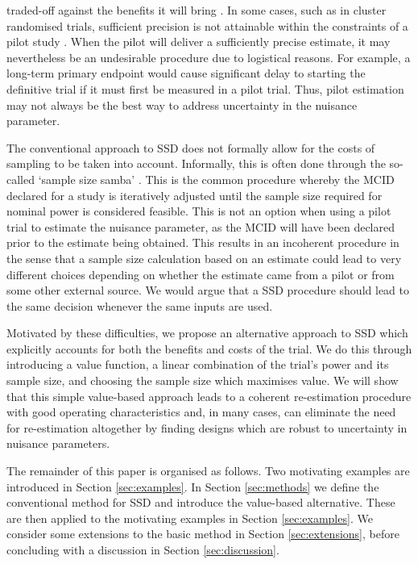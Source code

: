 \documentclass[sagev, Crown]{sagej}
\begin{document}
traded-off against the benefits it will bring \cite{Teare2014, Whitehead2015}. In some cases, such as in cluster randomised trials, sufficient precision is not attainable within the constraints of a pilot study \cite{Lake2002, Eldridge2015}. When the pilot will deliver a sufficiently  precise estimate, it may nevertheless be an undesirable procedure due to logistical reasons. For example, a long-term primary endpoint would cause significant delay to starting the definitive trial if it must first be measured in a pilot trial. Thus, pilot estimation may not always be the best way to address uncertainty in the nuisance parameter.

The conventional approach to SSD does not formally allow for the costs of sampling to be taken into account. Informally, this is often done through the so-called `sample size samba' \cite{Schulz2005}. This is the common procedure whereby the MCID declared for a study is iteratively adjusted until the sample size required for nominal power is considered feasible. This is not an option when using a pilot trial to estimate the nuisance parameter, as the MCID will have been declared prior to the estimate being obtained. This results in an incoherent procedure in the sense that a sample size calculation based on an estimate could lead to very different choices depending on whether the estimate came from a pilot or from some other external source. We would argue that a SSD procedure should lead to the same decision whenever the same inputs are used.

Motivated by these difficulties, we propose an alternative approach to SSD which explicitly accounts for both the benefits and costs of the trial. We do this through introducing a value function, a linear combination of the trial's power and its sample size, and choosing the sample size which maximises value. We will show that this simple value-based approach  leads to a coherent re-estimation procedure with good operating characteristics and, in many cases, can eliminate the need for re-estimation altogether by finding designs which are robust to uncertainty in nuisance parameters.

The remainder of this paper is organised as follows. Two motivating examples are introduced in Section \ref{sec:examples}. In Section \ref{sec:methods} we define the conventional method for SSD and introduce the value-based alternative. These are then applied to the motivating examples in Section \ref{sec:examples}. We consider some extensions to the basic method in Section \ref{sec:extensions}, before concluding with a discussion in Section \ref{sec:discussion}.
\end{document}
